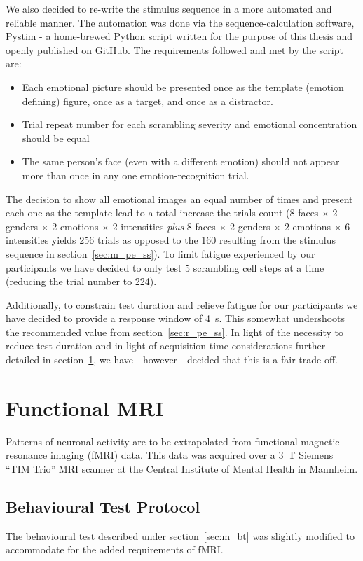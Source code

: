 	    We also decided to re-write the stimulus sequence in a more automated and reliable manner.
	    The automation was done via the sequence-calculation software, Pystim\cite{pystim} - a home-brewed Python script written for the purpose of this thesis and openly published on GitHub.
	    The requirements followed and met by the script are:
	    \begin{itemize}
		\item Each emotional picture should be presented once as the template (emotion defining) figure, once as a target, and once as a distractor.
		\item Trial repeat number for each scrambling severity and emotional concentration should be equal
		\item The same person's face (even with a different emotion) should not appear more than once in any one emotion-recognition trial.
	    \end{itemize}
	    The decision to show all emotional images an equal number of times and present each one as the template lead to a total increase the trials count
	    (8 faces $\times$ 2 genders $\times$ 2 emotions $\times$ 2 intensities \textit{plus} 8 faces $\times$ 2 genders $\times$ 2 emotions $\times$ 6 intensities yields 256 trials as opposed to the 160 resulting from the stimulus sequence in section~\ref{sec:m_pe_ss}).
	    To limit fatigue experienced by our participants we have decided to only test 5 scrambling cell steps at a time (reducing the trial number to 224).
	    
	    Additionally, to constrain test duration and relieve fatigue for our participants we have decided to provide a response window of \SI{4}{\second}.
	    This somewhat undershoots the recommended value from section~\ref{sec:r_pe_ss}.
	    In light of the necessity to reduce test duration and in light of acquisition time considerations further detailed in section~\ref{sec:m_fmri}, we have - however - decided that this is a fair trade-off.
    \section{Functional MRI}\label{sec:m_fmri}
	Patterns of neuronal activity are to be extrapolated from functional magnetic resonance imaging (fMRI) data.
	This data was acquired over a \SI{3}{\tesla} Siemens “TIM Trio” MRI scanner at the Central Institute of Mental Health in Mannheim.
	\subsection{Behavioural Test Protocol}
	    The behavioural test described under section~\ref{sec:m_bt} was slightly modified to accommodate for the added requirements of fMRI.
	    
